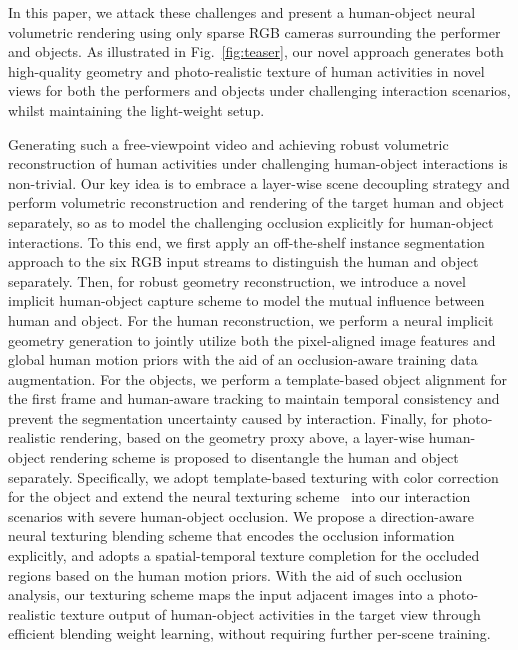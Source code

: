 In this paper, we attack these challenges and present a human-object neural volumetric rendering using only sparse RGB cameras surrounding the performer and objects.
%
As illustrated in Fig.~\ref{fig:teaser}, our novel approach generates both high-quality geometry
and photo-realistic texture of human activities in novel views for both the performers and objects under challenging interaction scenarios, whilst maintaining the light-weight setup.



Generating such a free-viewpoint video and achieving robust volumetric reconstruction of human activities under challenging human-object interactions is non-trivial.
Our key idea is to embrace a layer-wise scene decoupling strategy and perform volumetric reconstruction and rendering of the target human and object
separately, so as to model the challenging occlusion explicitly for human-object interactions. 
To this end, we first apply an off-the-shelf instance segmentation approach to the six RGB input streams to distinguish the human and object separately.
%
Then, for robust geometry reconstruction, we introduce a novel implicit human-object capture scheme to model the mutual influence between human and object.
%
For the human reconstruction, we perform a neural implicit geometry generation to jointly utilize both the pixel-aligned image features and global human motion priors with the aid of an occlusion-aware training data augmentation. 
%
For the objects, we perform a template-based object alignment for the first frame and human-aware tracking to maintain temporal consistency and prevent the segmentation uncertainty caused by interaction.
Finally, for photo-realistic rendering, based on the geometry proxy above, a layer-wise human-object rendering scheme is proposed to disentangle the human and object separately.
%
Specifically, we adopt template-based texturing with color correction for the object and extend the neural texturing scheme~\cite{NeuralHumanFVV2021CVPR} into our interaction scenarios with severe human-object occlusion.
%
We propose a direction-aware neural texturing blending scheme that encodes the occlusion information explicitly, and adopts a spatial-temporal texture completion for the occluded regions based on the human motion priors.
%
With the aid of such occlusion analysis, our texturing scheme maps the input adjacent images into a photo-realistic texture output of human-object activities in the target view through efficient blending weight learning, without requiring further per-scene training.
